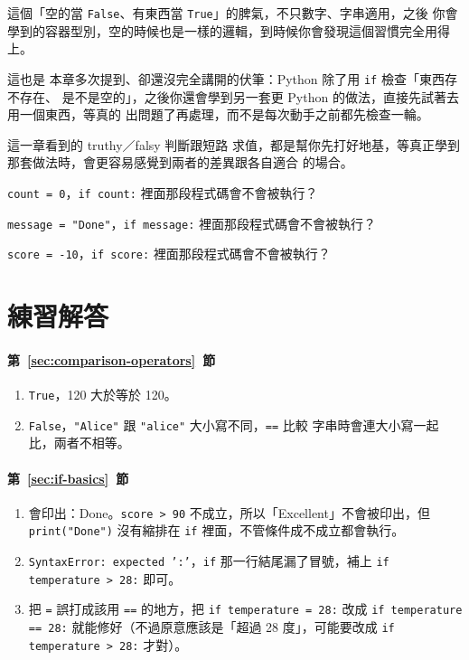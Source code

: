 這個「空的當 \texttt{False}、有東西當 \texttt{True}」的脾氣，不只數字、字串適用，之後
你會學到的容器型別，空的時候也是一樣的邏輯，到時候你會發現這個習慣完全用得上。

這也是
本章多次提到、卻還沒完全講開的伏筆：Python 除了用 \texttt{if} 檢查「東西存不存在、
是不是空的」，之後你還會學到另一套更 Python 的做法，直接先試著去用一個東西，等真的
出問題了再處理，而不是每次動手之前都先檢查一輪。

這一章看到的 truthy／falsy 判斷跟短路
求值，都是幫你先打好地基，等真正學到那套做法時，會更容易感覺到兩者的差異跟各自適合
的場合。

\begin{drills}[label=drills:truthy-falsy]
\item \texttt{count = 0}，\texttt{if count:} 裡面那段程式碼會不會被執行？
\item \texttt{message = "Done"}，\texttt{if message:} 裡面那段程式碼會不會被執行？
\item \texttt{score = -10}，\texttt{if score:} 裡面那段程式碼會不會被執行？
\end{drills}

\section*{練習解答}

\paragraph{第~\ref{sec:comparison-operators}~節}
\begin{enumerate}
\item \texttt{True}，120 大於等於 120。
\item \texttt{False}，\texttt{"Alice"} 跟 \texttt{"alice"} 大小寫不同，\texttt{==} 比較
字串時會連大小寫一起比，兩者不相等。
\end{enumerate}

\paragraph{第~\ref{sec:if-basics}~節}
\begin{enumerate}
\item 會印出：Done。\texttt{score > 90} 不成立，所以「Excellent」不會被印出，但
\texttt{print("Done")} 沒有縮排在 \texttt{if} 裡面，不管條件成不成立都會執行。
\item \texttt{SyntaxError: expected ':'}，\texttt{if} 那一行結尾漏了冒號，補上
\texttt{if temperature > 28:} 即可。
\item 把 \texttt{=} 誤打成該用 \texttt{==} 的地方，把 \texttt{if temperature = 28:}
改成 \texttt{if temperature == 28:} 就能修好（不過原意應該是「超過 28 度」，可能要改成
\texttt{if temperature > 28:} 才對）。
\end{enumerate}

